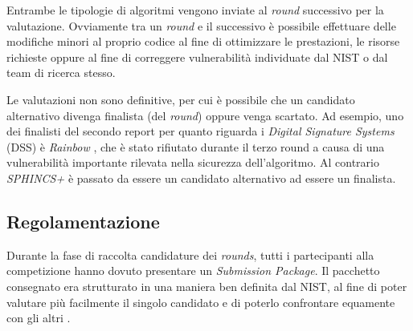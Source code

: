 Entrambe le tipologie di algoritmi vengono inviate al \textit{round} successivo per la valutazione.
Ovviamente tra un \textit{round} e il successivo è possibile effettuare delle modifiche minori al proprio codice al fine di ottimizzare le prestazioni, le risorse richieste oppure al fine di correggere vulnerabilità individuate dal NIST o dal team di ricerca stesso.

Le valutazioni non sono definitive, per cui è possibile che un candidato alternativo divenga finalista (del \textit{round}) oppure venga scartato. Ad esempio, uno dei finalisti del secondo report per quanto riguarda i \textit{Digital Signature Systems} (DSS) è \textit{Rainbow} \cite{rainbow-website}, che è stato rifiutato durante il terzo round a causa di una vulnerabilità importante rilevata nella sicurezza dell'algoritmo. Al contrario \textit{SPHINCS+} \cite{sphincs-plus-website} è passato da essere un candidato alternativo ad essere un finalista.

\subsection{Regolamentazione}

Durante la fase di raccolta candidature dei \textit{rounds}, tutti i partecipanti alla competizione hanno dovuto presentare un \textit{Submission Package}. Il pacchetto consegnato era strutturato in una maniera ben definita dal NIST, al fine di poter valutare più facilmente il singolo candidato e di poterlo confrontare equamente con gli altri \cite{NISTevaluationCriteria}.

